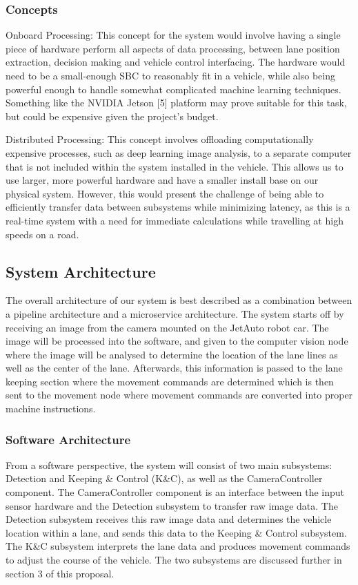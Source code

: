 \documentclass[titlepage]{article}
\begin{document}
\subsubsection{Concepts}
Onboard Processing: This concept for the system would involve having a single piece of hardware perform all aspects of data processing, between lane position extraction, decision making and vehicle control interfacing. The hardware would need to be a small-enough SBC to reasonably fit in a vehicle, while also being powerful enough to handle somewhat complicated machine learning techniques. Something like the NVIDIA Jetson [5] platform may prove suitable for this task, but could be expensive given the project’s budget.

Distributed Processing: This concept involves offloading computationally expensive processes, such as deep learning image analysis, to a separate computer that is not included within the system installed in the vehicle. This allows us to use larger, more powerful hardware and have a smaller install base on our physical system. However, this would present the challenge of being able to efficiently transfer data between subsystems while minimizing latency, as this is a real-time system with a need for immediate calculations while travelling at high speeds on a road.


\subsection{System Architecture}
The overall architecture of our system is best described as a combination between a pipeline architecture and a microservice architecture. The system starts off by receiving an image from the camera mounted on the JetAuto robot car. The image will be processed into the software, and given to the computer vision node where the image will be analysed to determine the location of the lane lines as well as the center of the lane. Afterwards, this information is passed to the lane keeping section where the movement commands are determined which is then sent to the movement node where movement commands are converted into proper machine instructions. 

\subsubsection{Software Architecture}
From a software perspective, the system will consist of two main subsystems: Detection and Keeping \& Control (K\&C), as well as the CameraController component. The CameraController component is an interface between the input sensor hardware and the Detection subsystem to transfer raw image data. The Detection subsystem receives this raw image data and determines the vehicle location within a lane, and sends this data to the Keeping \& Control subsystem. The K\&C subsystem interprets the lane data and produces movement commands to adjust the course of the vehicle. The two subsystems are discussed further in section 3 of this proposal.
\end{document}
